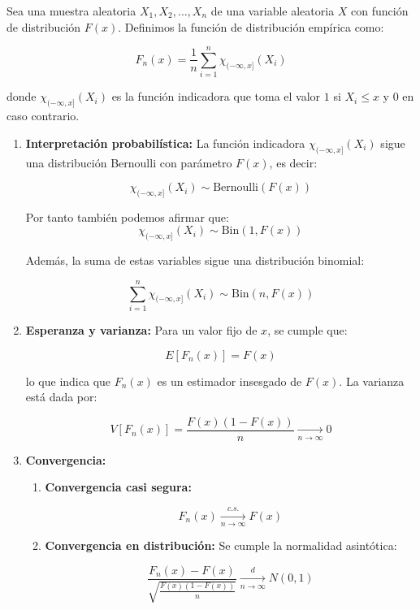 \begin{proposición}
Sea una muestra aleatoria \( X_1, X_2, \dots, X_n \) de una variable aleatoria \( X \) con función de distribución \( F(x) \). Definimos la función de distribución empírica como:

$$
	F_n(x) = \frac{1}{n} \sum_{i=1}^{n} \chi_{(-\infty,x]}(X_i)
$$

donde \( \chi_{(-\infty,x]}(X_i) \) es la función indicadora que toma el valor \( 1 \) si \( X_i \leq x \) y \( 0 \) en caso contrario.

\begin{enumerate}
	\item \textbf{Interpretación probabilística:}
	      La función indicadora \( \chi_{(-\infty,x]}(X_i) \) sigue una distribución Bernoulli con parámetro \( F(x) \), es decir:

	      $$
		      \chi_{(-\infty,x]}(X_i) \sim \text{Bernoulli}(F(x))
	      $$

	      Por tanto también podemos afirmar que: $$\chi_{(-\infty,x]}(X_i) \sim \text{Bin}(1, F(x))$$

	      Además, la suma de estas variables sigue una distribución binomial:

	      $$ \sum_{i=1}^{n} \chi_{(-\infty,x]}(X_i) \sim \text{Bin}(n, F(x)) $$
	\item \textbf{Esperanza y varianza:}
	      Para un valor fijo de \( x \), se cumple que:

	      $$ E[F_n(x)] = F(x) $$

	      lo que indica que \( F_n(x) \) es un estimador insesgado de \( F(x) \).
	      La varianza está dada por:

	      $$ V[F_n(x)] = \frac{F(x)(1 - F(x))}{n} \underset{n \to \infty}{\longrightarrow} 0 $$

	\item \textbf{Convergencia:}
	      \begin{enumerate}
		      \item \textbf{Convergencia casi segura:}

		            $$ F_n(x) \underset{n \to \infty}{\xrightarrow{c.s.}} F(x) $$

		      \item \textbf{Convergencia en distribución:}
		            Se cumple la normalidad asintótica:

		            $$ \frac{F_n(x) - F(x)}{\sqrt{\frac{F(x)(1-F(x))}{n}}} \underset{n \to \infty}{\xrightarrow{d}} N(0,1) $$


\end{enumerate}
\end{enumerate}
\end{proposición}
